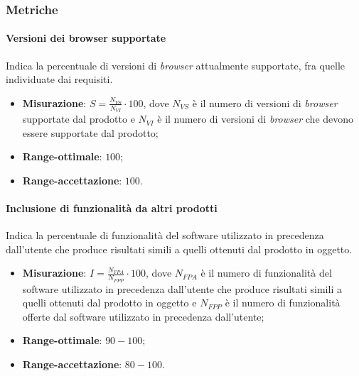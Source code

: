\subsubsection{Metriche}
\paragraph{Versioni dei browser supportate}
Indica la percentuale di versioni di \textit{browser} attualmente supportate, fra quelle individuate dai requisiti.
\begin{itemize}
\item \textbf{Misurazione}: $S=\frac{N_{VS}}{N_{VI}} \cdot 100$, dove $N_{VS}$ è il numero di versioni di \textit{browser} supportate dal prodotto e $N_{VI}$ è il numero di versioni di \textit{browser} che devono essere supportate dal prodotto;
\item \textbf{Range-ottimale}: $100$;
\item \textbf{Range-accettazione}: $100$.
\end{itemize}
\paragraph{Inclusione di funzionalità da altri prodotti}
Indica la percentuale di funzionalità del software utilizzato in precedenza dall'utente che produce risultati simili a quelli ottenuti dal prodotto in oggetto.
\begin{itemize}
\item \textbf{Misurazione}: $I=\frac{N_{FPA}}{N_{FPP}} \cdot 100$, dove $N_{FPA}$ è il numero di funzionalità del software utilizzato in precedenza dall'utente che produce risultati simili a quelli ottenuti dal prodotto in oggetto e $N_{FPP}$ è il numero di funzionalità offerte dal software utilizzato in precedenza dall'utente;
\item \textbf{Range-ottimale}: $90 - 100$;
\item \textbf{Range-accettazione}: $80 - 100$.
\end{itemize}